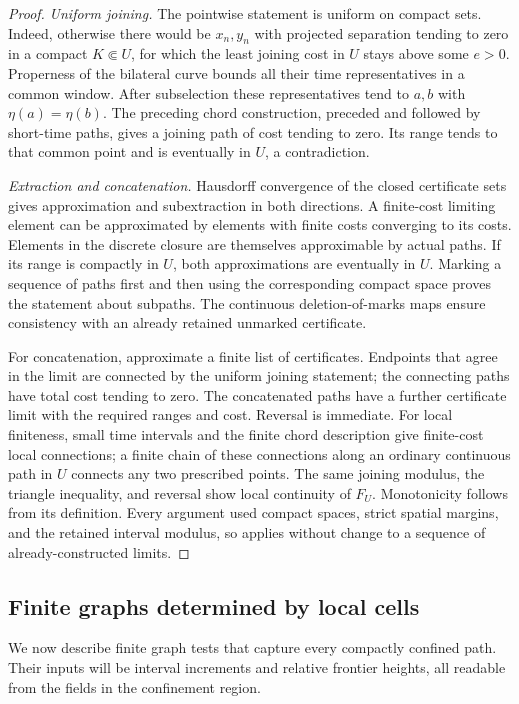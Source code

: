 \begin{proof}
\emph{Uniform joining.} The pointwise statement is uniform on compact sets.
Indeed, otherwise there would be $x_n,y_n$ with projected separation
tending to zero in a compact $K\Subset U$, for which the least joining
cost in $U$ stays above some $e>0$.  Properness of the bilateral curve
bounds all their time representatives in a common window.  After
subselection these representatives tend to $a,b$ with $\eta(a)=\eta(b)$.
The preceding chord construction, preceded and followed by short-time
paths, gives a joining path of cost tending to zero.  Its range tends
to that common point and is eventually in $U$, a contradiction.

\emph{Extraction and concatenation.} Hausdorff convergence of the closed certificate sets gives approximation
and subextraction in both directions.  A finite-cost limiting element
can be approximated by elements with finite costs converging to its
costs.  Elements in the discrete closure are themselves approximable by
actual paths.  If its range is compactly in $U$, both approximations
are eventually in $U$.  Marking a sequence of paths first and then using
the corresponding compact space proves the statement about subpaths.
The continuous deletion-of-marks maps ensure consistency with an already
retained unmarked certificate.

For concatenation, approximate a finite list of certificates.  Endpoints
that agree in the limit are connected by the uniform joining statement;
the connecting paths have total cost tending to zero.  The concatenated
paths have a further certificate limit with the required ranges and
cost.  Reversal is immediate.  For local finiteness, small time intervals
and the finite chord description give finite-cost local connections;
a finite chain of these connections along an ordinary continuous path
in $U$ connects any two prescribed points.  The same joining modulus,
the triangle inequality, and reversal show local continuity of $F_U$.
Monotonicity follows from its definition.  Every argument used compact
spaces, strict spatial margins, and the retained interval modulus, so
applies without change to a sequence of already-constructed limits.
\end{proof}

\subsection{Finite graphs determined by local cells}

We now describe finite graph tests that capture every compactly confined
path. Their inputs will be interval increments and relative frontier
heights, all readable from the fields in the confinement region.

